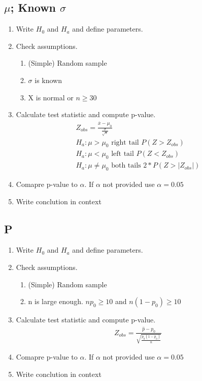 \subsection{$\mu$; Known $\sigma$}
\begin{enumerate}
\item Write $H_0$ and $H_a$ and define parameters.
\item Check assumptions.
  \begin{enumerate}
  \item (Simple) Random sample
  \item $\sigma$ is known
  \item X is normal or $n \geq 30$
  \end{enumerate}
\item Calculate test statistic and compute p-value.
  \begin{align}
    Z_{obs} = \frac{\overbar{x} - \mu_0}{\frac{\sigma}{\sqrt{n}}} \\
    H_a : \mu > \mu_0 \text{ right tail } P(Z > Z_{obs}) \\
    H_a : \mu < \mu_0 \text{ left tail } P(Z < Z_{obs}) \\
    H_a : \mu \ne \mu_0 \text{ both tails } 2*P(Z > \lvert Z_{obs}\rvert)
  \end{align}
\item Comapre p-value to $\alpha$. If $\alpha$ not provided use $\alpha = 0.05$
\item Write conclution in context
\end{enumerate}

\subsection{P}
\begin{enumerate}
\item Write $H_0$ and $H_a$ and define parameters.
\item Check assumptions.
  \begin{enumerate}
  \item (Simple) Random sample
  \item n is large enough. $np_0 \geq 10$ and $ n(1 - p_0) \geq 10$
  \end{enumerate}
\item Calculate test statistic and compute p-value.
  \begin{align}
    Z_{obs} = \frac{\hat{p} - p_0}{\sqrt{\frac{p_0(1-p_0)}{n}}}
  \end{align}
\item Comapre p-value to $\alpha$. If $\alpha$ not provided use $\alpha = 0.05$
\item Write conclution in context
\end{enumerate}

